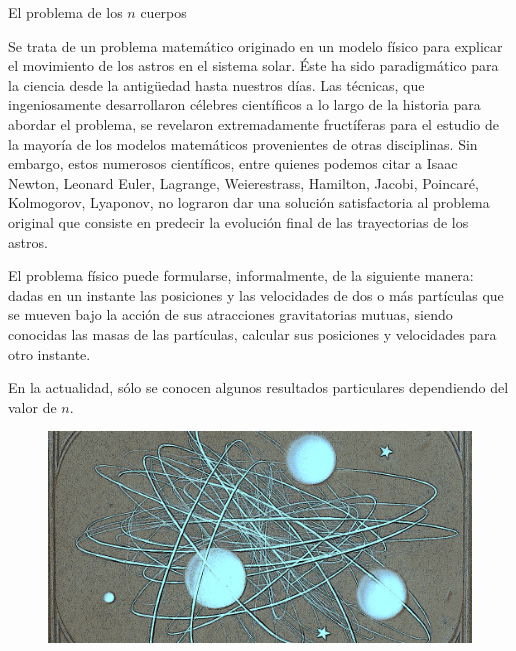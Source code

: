 \newpage %
\begin{myblock}{El problema de los $n$ cuerpos}

\vspace{2mm} Se trata de un problema matemático originado en un modelo físico para explicar el movimiento de los astros en el sistema solar. Éste ha sido paradigmático para la ciencia desde la antigüedad hasta nuestros días. Las técnicas, que ingeniosamente desarrollaron célebres científicos a lo largo de la historia para abordar el problema, se revelaron extremadamente fructíferas para el estudio de la mayoría de los modelos matemáticos provenientes de otras disciplinas. Sin embargo, estos numerosos científicos, entre quienes podemos citar a Isaac Newton, Leonard Euler, Lagrange, Weierestrass, Hamilton, Jacobi, Poincaré, Kolmogorov, Lyaponov, no lograron dar una solución satisfactoria al problema original que consiste en predecir la evolución final de las trayectorias de los astros. 

\vspace{2mm} El problema físico puede formularse, informalmente, de la siguiente manera: dadas en un instante las posiciones y las velocidades de dos o más partículas que se mueven bajo la acción de sus atracciones gravitatorias mutuas, siendo conocidas las masas de las partículas, calcular sus posiciones y velocidades para otro instante. 

\vspace{2mm} En la actualidad, sólo se conocen algunos resultados particulares dependiendo del valor de $n$.	

\begin{figure}[H]
	\centering
	\includegraphics[width=1\textwidth]{imagenes/imagenes13/T13IM03.png}
\end{figure}
\end{myblock}
